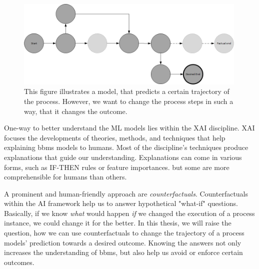 \documentclass[./../../paper.tex]{subfiles}
\begin{document}
\begin{figure}[htb]
    \centering
    \includegraphics[width=0.99\textwidth]{figures/counterfactual_goal.png}
    \caption{This figure illustrates a model, that predicts a certain trajectory of the process. However, we want to change the process steps in such a way, that it changes the outcome.}
    \label{fig:desired_outcome}
\end{figure}

\noindent One-way to better understand the \gls{ML} models lies within the \gls{XAI} discipline. XAI focuses the developments of theories, methods, and techniques that help explaining \glspl{bbm} models to humans. Most of the discipline's techniques produce explanations that guide our understanding. Explanations can come in various forms, such as IF-THEN rules\autocite[p.90]{molnar2019} or feature importances\autocite[p.45]{molnar2019}. but some are more comprehensible for humans than others. 

A prominent and human-friendly approach are \emph{counterfactuals}\autocite[p. 221]{molnar2019}. Counterfactuals within the AI framework help us to answer hypothetical "what-if" questions. Basically, if we know \emph{what} would happen \emph{if} we changed the execution of a process instance, we could change it for the better. In this thesis, we will raise the question, how we can use counterfactuals to change the trajectory of a process models' prediction towards a desired outcome. Knowing the answers not only increases the understanding of \glspl{bbm}, but also help us avoid or enforce certain outcomes. 
\end{document}
